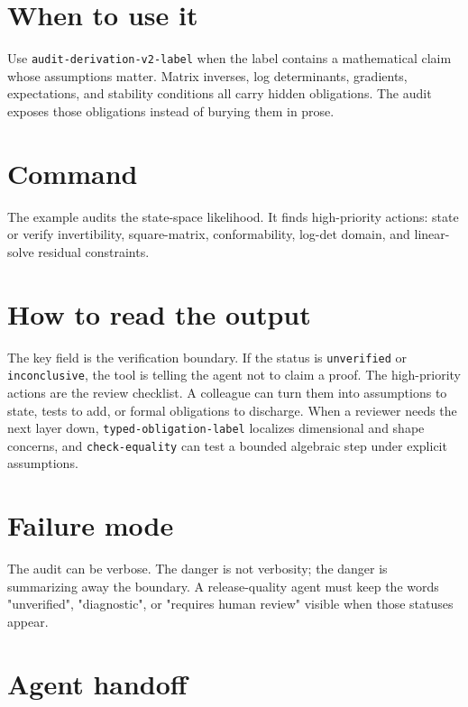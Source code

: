 \documentclass[12pt,a4paper,openany]{book}
\begin{document}
\section*{When to use it}

Use \texttt{audit-derivation-v2-label} when the label contains a mathematical
claim whose assumptions matter. Matrix inverses, log determinants, gradients,
expectations, and stability conditions all carry hidden obligations. The audit
exposes those obligations instead of burying them in prose.

\section*{Command}

The example audits the state-space likelihood. It finds high-priority actions:
state or verify invertibility, square-matrix, conformability, log-det domain, and
linear-solve residual constraints.



\section*{How to read the output}

The key field is the verification boundary. If the status is \texttt{unverified}
or \texttt{inconclusive}, the tool is telling the agent not to claim a proof.
The high-priority actions are the review checklist. A colleague can turn them
into assumptions to state, tests to add, or formal obligations to discharge.
When a reviewer needs the next layer down, \texttt{typed-obligation-label}
localizes dimensional and shape concerns, and \texttt{check-equality} can test a
bounded algebraic step under explicit assumptions.

\section*{Failure mode}

The audit can be verbose. The danger is not verbosity; the danger is summarizing
away the boundary. A release-quality agent must keep the words "unverified",
"diagnostic", or "requires human review" visible when those statuses appear.

\section*{Agent handoff}
\end{document}
